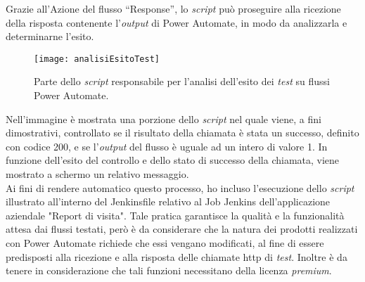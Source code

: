 Grazie all'Azione del flusso “Response”, lo \emph{script} può proseguire alla ricezione della risposta contenente l'\emph{output} di Power Automate, in modo da analizzarla e determinarne l'esito.
\begin{figure}[htbp] 
    \centering 
    \texttt{[image: analisiEsitoTest]} 
    \caption{Parte dello \emph{script} responsabile per l'analisi dell'esito dei \emph{test} su flussi Power Automate.}
    \label{fig:analisiEsitoTest}
\end{figure}
\newline Nell'immagine è mostrata una porzione dello \emph{script} nel quale viene, a fini dimostrativi, controllato se il risultato della chiamata è stata un successo, definito con codice 200, e se l'\emph{output} del flusso è uguale ad un intero di valore 1.
In funzione dell'esito del controllo e dello stato di successo della chiamata, viene mostrato a schermo un relativo messaggio.\\
Ai fini di rendere automatico questo processo, ho incluso l'esecuzione dello \emph{script} illustrato all'interno del Jenkinsfile relativo al Job Jenkins dell'applicazione aziendale "Report di visita".
Tale pratica garantisce la qualità e la funzionalità attesa dai flussi testati, però è da considerare che la natura dei prodotti realizzati con Power Automate richiede che essi vengano modificati, al fine di essere predisposti alla ricezione e alla risposta delle chiamate \gls{http} di \emph{test}.
Inoltre è da tenere in considerazione che tali funzioni necessitano della licenza \emph{premium}.\\

